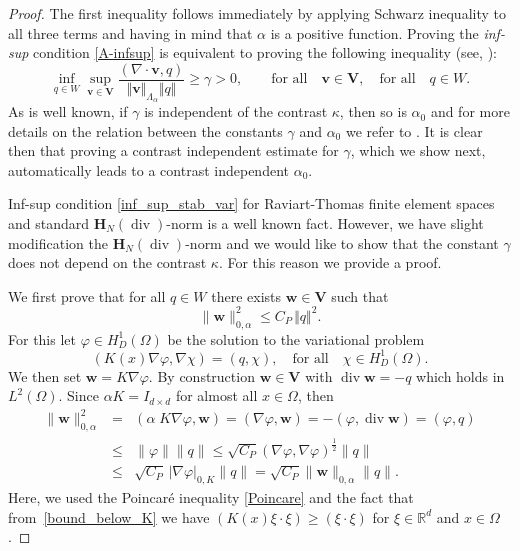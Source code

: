 \documentclass[11pt]{amsart}
\numberwithin{equation}{section}
\theoremstyle{definition}\newtheorem{example}{Example}[section]
\begin{document}
\begin{proof}
The first inequality follows immediately by applying Schwarz inequality to all three terms and having
in mind that ${{\alpha}} $ is a positive function. Proving the {\it inf-sup} condition \eqref{A-infsup} is equivalent 
to proving the following inequality (see, \cite{Ern-Guermond}):
 \begin{equation}\label{inf_sup_stab_var}
  \inf_{q\in W} \sup_{{{\mathbf v}}\in{{\boldsymbol V}}}\frac{(\nabla\cdot {{\mathbf v}},q)}{\Vert {{\mathbf v}} \Vert_{\Lambda_{{\alpha}}}
\Vert q \Vert}\ge 
\gamma >0, \qquad \mbox{for all}\quad {{\mathbf v}}\in{{\boldsymbol V}},\quad \mbox{for all}\quad q\in W. 
 \end{equation}
 As is well known, if $\gamma $ is independent of the contrast
 $\kappa$, then so is $\alpha_0$ and for more details on the relation
 between the constants $\gamma$ and $\alpha_0$ we refer to
 \cite{Xu2003Zikatanov}. It is clear then that proving a contrast
 independent estimate for $\gamma$, which we show next, automatically
 leads to a contrast independent $\alpha_0$.

Inf-sup condition \eqref{inf_sup_stab_var} for Raviart-Thomas 
finite element spaces  and standard ${{\boldsymbol H}}_N({\operatorname{div}})$-norm is a well known fact.  
However, we have slight modification the ${{\boldsymbol H}}_N({\operatorname{div}})$-norm 
and we would like to show that the constant $\gamma$ does not
depend on the contrast $\kappa$. For this reason we provide a proof.

We first prove that for all $q\in W$ there exists ${{\mathbf w}}\in{{\boldsymbol V}}$ such that 
\begin{equation}\label{lem:stab_var_1}
\|{{\mathbf w}}\|_{0,\alpha}^2\le C_P \, \Vert q \Vert^2.
\end{equation}
For this let $\varphi\in H_D^1(\Omega)$ be the solution to the variational problem
\begin{equation}\label{eq:standard-variational}
( K(x) \nabla \varphi,\nabla\chi ) = (q, \chi), 
\quad \mbox{for all}\quad \chi\in H_D^1(\Omega).
\end{equation}
We then set ${{\mathbf w}} = K \nabla \varphi$. By construction ${{\mathbf w}} \in {{\boldsymbol V}}$ 
with ${\operatorname{div}} {{\mathbf w}}= -q$ which holds in $L^2(\Omega)$. 
Since $\alpha K = I_{d\times d}$ for almost all $x\in \Omega$,  then
\begin{eqnarray*}
\|{{\mathbf w}}\|_{0,\alpha}^2& = & 
(\alpha\;K\nabla\varphi,{{\mathbf w}})= (\nabla\varphi,{{\mathbf w}})
= -(\varphi,{\operatorname{div}} {{\mathbf w}})=(\varphi, q)\\ &\le& 
\|\varphi\|\|q\|
\le \sqrt{C_P}(\nabla\varphi,\nabla\varphi)^\frac12 \|q\|\\
&\le& \sqrt{C_P} \,|\nabla\varphi|_{0,K}\|q\|
= \sqrt{C_P} \|{{\mathbf w}}\|_{0,\alpha}\|q\|.
\end{eqnarray*}
Here, we used the Poincar\'e inequality \eqref{Poincare} and the fact
that from~\eqref{bound_below_K} we have 
$ (K(x)\xi\cdot\xi) \ge (\xi\cdot\xi)$ for $\xi\in \mathbb{R}^d$ and $x\in \Omega$.


\end{proof}
\end{document}

